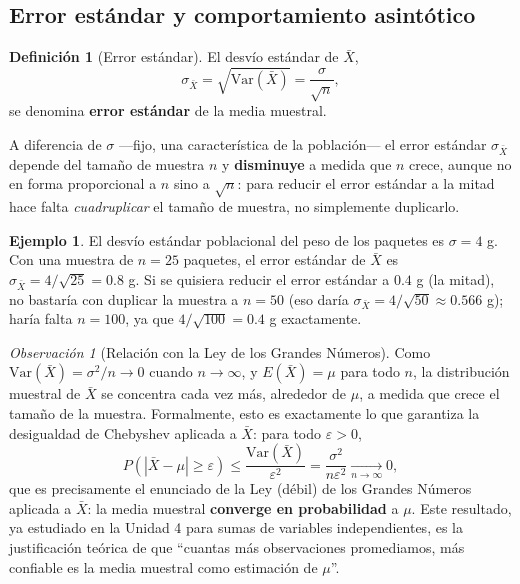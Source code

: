\documentclass[11pt,a4paper]{article}
\theoremstyle{plain}
\theoremstyle{definition}
\newtheorem{definicion}[teorema]{Definición}
\newtheorem{ejemplo}[teorema]{Ejemplo}
\theoremstyle{remark}
\newtheorem{observacion}[teorema]{Observación}
\begin{document}
\subsection{Error estándar y comportamiento asintótico}

\begin{definicion}[Error estándar]
El desvío estándar de $\bar X$,
$$\sigma_{\bar X} = \sqrt{\mathrm{Var}(\bar X)} = \frac{\sigma}{\sqrt n},$$
se denomina \textbf{error estándar} de la media muestral.
\end{definicion}

A diferencia de $\sigma$ —fijo, una característica de la población— el error estándar $\sigma_{\bar X}$ depende del tamaño de muestra $n$ y \textbf{disminuye} a medida que $n$ crece, aunque no en forma proporcional a $n$ sino a $\sqrt n$: para reducir el error estándar a la mitad hace falta \emph{cuadruplicar} el tamaño de muestra, no simplemente duplicarlo.

\begin{ejemplo}
El desvío estándar poblacional del peso de los paquetes es $\sigma=4$ g. Con una muestra de $n=25$ paquetes, el error estándar de $\bar X$ es $\sigma_{\bar X}=4/\sqrt{25}=0.8$ g. Si se quisiera reducir el error estándar a $0.4$ g (la mitad), no bastaría con duplicar la muestra a $n=50$ (eso daría $\sigma_{\bar X}=4/\sqrt{50}\approx 0.566$ g); haría falta $n=100$, ya que $4/\sqrt{100}=0.4$ g exactamente.
\end{ejemplo}

\begin{observacion}[Relación con la Ley de los Grandes Números]
Como $\mathrm{Var}(\bar X)=\sigma^2/n \to 0$ cuando $n\to\infty$, y $E(\bar X)=\mu$ para todo $n$, la distribución muestral de $\bar X$ se concentra cada vez más, alrededor de $\mu$, a medida que crece el tamaño de la muestra. Formalmente, esto es exactamente lo que garantiza la desigualdad de Chebyshev aplicada a $\bar X$: para todo $\varepsilon>0$,
$$P(|\bar X - \mu| \geq \varepsilon) \leq \frac{\mathrm{Var}(\bar X)}{\varepsilon^2} = \frac{\sigma^2}{n\varepsilon^2} \xrightarrow[n\to\infty]{} 0,$$
que es precisamente el enunciado de la Ley (débil) de los Grandes Números aplicada a $\bar X$: la media muestral \textbf{converge en probabilidad} a $\mu$. Este resultado, ya estudiado en la Unidad 4 para sumas de variables independientes, es la justificación teórica de que ``cuantas más observaciones promediamos, más confiable es la media muestral como estimación de $\mu$''.
\end{observacion}
\end{document}
